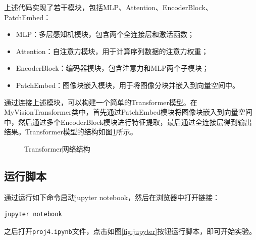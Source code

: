 上述代码实现了若干模块，包括MLP、Attention、EncoderBlock、PatchEmbed：

\begin{itemize}
    \item MLP：多层感知机模块，包含两个全连接层和激活函数；
    \item Attention：自注意力模块，用于计算序列数据的注意力权重；
    \item EncoderBlock：编码器模块，包含注意力和MLP两个子模块；
    \item PatchEmbed：图像块嵌入模块，用于将图像分块并嵌入到向量空间中。
\end{itemize}

通过连接上述模块，可以构建一个简单的Transformer模型。在MyVisionTransformer类中，首先通过PatchEmbed模块将图像块嵌入到向量空间中，然后通过多个EncoderBlock模块进行特征提取，最后通过全连接层得到输出结果。Transformer模型的结构如图\ref{fig:transformer}所示。

\begin{figure}[H]
    \centering
    \caption{Transformer网络结构}
    \label{fig:transformer}
\end{figure}

\subsection{运行脚本}

通过运行如下命令启动jupyter notebook，然后在浏览器中打开链接：

\begin{lstlisting}[style=Bash]
jupyter notebook
\end{lstlisting}

之后打开\texttt{proj4.ipynb}文件，点击如图\ref{fig:jupyter}按钮运行脚本，即可开始实验。

